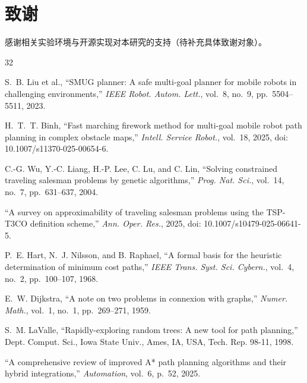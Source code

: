\documentclass[lettersize,journal]{IEEEtran}
\begin{document}
\section*{致谢}

感谢相关实验环境与开源实现对本研究的支持（待补充具体致谢对象）。

\begin{thebibliography}{32}


S.~B. Liu et al., ``SMUG planner: A safe multi-goal planner for mobile robots in challenging environments,'' \textit{IEEE Robot. Autom. Lett.}, vol.~8, no.~9, pp.~5504--5511, 2023.


H.~T.~T. Binh, ``Fast marching firework method for multi-goal mobile robot path planning in complex obstacle maps,'' \textit{Intell. Service Robot.}, vol.~18, 2025, doi: 10.1007/s11370-025-00654-6.


C.-G. Wu, Y.-C. Liang, H.-P. Lee, C. Lu, and C. Lin, ``Solving constrained traveling salesman problems by genetic algorithms,'' \textit{Prog. Nat. Sci.}, vol.~14, no.~7, pp.~631--637, 2004.


``A survey on approximability of traveling salesman problems using the TSP-T3CO definition scheme,'' \textit{Ann. Oper. Res.}, 2025, doi: 10.1007/s10479-025-06641-5.


P.~E. Hart, N.~J. Nilsson, and B. Raphael, ``A formal basis for the heuristic determination of minimum cost paths,'' \textit{IEEE Trans. Syst. Sci. Cybern.}, vol.~4, no.~2, pp.~100--107, 1968.


E.~W. Dijkstra, ``A note on two problems in connexion with graphs,'' \textit{Numer. Math.}, vol.~1, no.~1, pp.~269--271, 1959.


S.~M. LaValle, ``Rapidly-exploring random trees: A new tool for path planning,'' Dept. Comput. Sci., Iowa State Univ., Ames, IA, USA, Tech. Rep. 98-11, 1998.


``A comprehensive review of improved A* path planning algorithms and their hybrid integrations,'' \textit{Automation}, vol.~6, p.~52, 2025.



\end{thebibliography}
\end{document}
